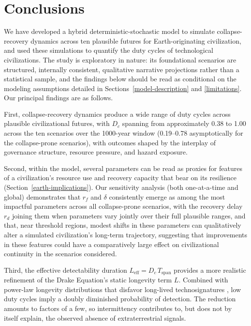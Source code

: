 \section{Conclusions}

We have developed a hybrid deterministic-stochastic model to simulate collapse-recovery dynamics across ten plausible futures for Earth-originating civilization, and used these simulations to quantify the duty cycles of technological civilizations. The study is exploratory in nature: its foundational scenarios are structured, internally consistent, qualitative narrative projections rather than a statistical sample, and the findings below should be read as conditional on the modeling assumptions detailed in Sections~\ref{model-description} and \ref{limitations}. Our principal findings are as follows.

First, collapse-recovery dynamics produce a wide range of duty cycles across plausible civilizational futures, with $D_c$ spanning from approximately 0.38 to 1.00 across the ten scenarios over the 1000-year window (0.19--0.78 asymptotically for the collapse-prone scenarios), with outcomes shaped by the interplay of governance structure, resource pressure, and hazard exposure.

Second, within the model, several parameters can be read as proxies for features of a civilization's resource use and recovery capacity that bear on its resilience (Section~\ref{earth-implications}). Our sensitivity analysis (both one-at-a-time and global) demonstrates that $r_f$ and $\delta$ consistently emerge as among the most impactful parameters across all collapse-prone scenarios, with the recovery delay $r_d$ joining them when parameters vary jointly over their full plausible ranges, and that, near threshold regions, modest shifts in these parameters can qualitatively alter a simulated civilization's long-term trajectory, suggesting that improvements in these features could have a comparatively large effect on civilizational continuity in the scenarios considered.

Third, the effective detectability duration $L_{\mathrm{eff}} = D_c \, T_{\mathrm{span}}$ provides a more realistic refinement of the Drake Equation's static longevity term $L$. Combined with power-law longevity distributions that disfavor long-lived technosignatures \citep{Balbi2024-bg}, low duty cycles imply a doubly diminished probability of detection. The reduction amounts to factors of a few, so intermittency contributes to, but does not by itself explain, the observed absence of extraterrestrial signals.

